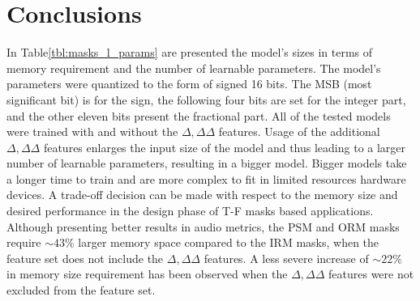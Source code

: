
\section{Conclusions}
In Table\;\ref{tbl:masks_l_params} are presented
the model's sizes in terms of memory requirement
and the number of learnable parameters.
The model's parameters were quantized
to the form of signed 16 bits. 
The MSB (most significant bit) is for the sign,
the following four bits are set for the integer part,
and the other eleven bits present the fractional part.
All of the tested models were trained with and without
the \(\Delta, \Delta\Delta\) features.
Usage of the additional \(\Delta, \Delta\Delta\) features
enlarges the input size of the model and thus
leading to a larger number of learnable parameters, resulting
in a bigger model. Bigger models take a longer time to train
and are more complex to fit in limited resources hardware 
devices. A trade-off decision can be made with respect to
the memory size and desired performance in the design phase
of T-F masks based applications. Although presenting
better results in audio metrics, the PSM and ORM
masks require \(\sim 43\%\) larger memory space
compared to the IRM masks, 
when the feature set does not include
the \(\Delta, \Delta\Delta\) features.
A less severe increase of \(\sim 22\%\) in memory 
size requirement has been observed 
when the \(\Delta, \Delta\Delta\) features
were not excluded from the feature set.




